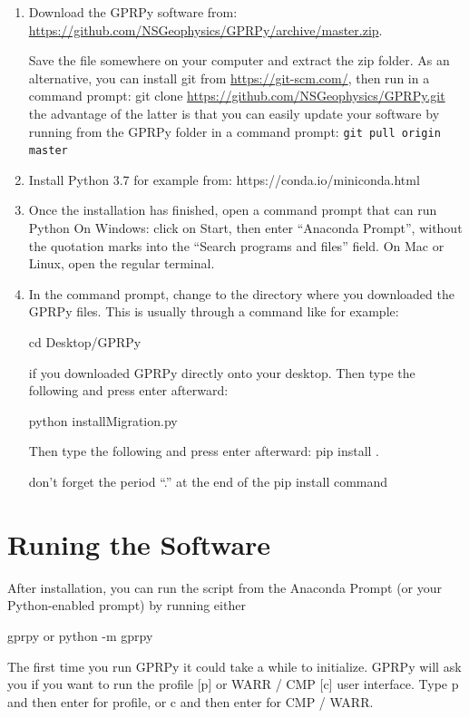 \documentclass[12pt]{article}
\begin{document}
				\begin{enumerate}

\item Download the GPRPy software from: \url{https://github.com/NSGeophysics/GPRPy/archive/master.zip}.

Save the file somewhere on your computer and extract the zip folder.  As an alternative, you can install git from \url{https://git-scm.com/}, then run in a command prompt: git clone \url{https://github.com/NSGeophysics/GPRPy.git} the advantage of the latter is that you can easily update your software by running from the GPRPy folder in a command prompt: \verb$git pull origin master$

\item Install Python 3.7 for example from:
https://conda.io/miniconda.html

\item Once the installation has finished, open a command prompt that can run Python 
On Windows: click on Start, then enter “Anaconda Prompt”, without the quotation marks into the “Search programs and files” field. On Mac or Linux, open the regular terminal.

\item In the command prompt, change to the directory where you downloaded the GPRPy files. This is usually through a command like for example:

cd Desktop/GPRPy

if you downloaded GPRPy directly onto your desktop. Then type the following and press enter afterward:

python installMigration.py

Then type the following and press enter afterward:
pip install .

don’t forget the period “.” at the end of the pip install command

				\end{enumerate}


\section{Runing the Software}\label{Runing the Software}

After installation, you can run the script from the Anaconda Prompt (or your Python-enabled prompt) by running either

gprpy
or
python -m gprpy

The first time you run GPRPy it could take a while to initialize. GPRPy will ask you if you want to run the profile [p] or WARR / CMP [c] user interface. Type
p
and then enter for profile, or
c
and then enter for CMP / WARR.
\end{document}
